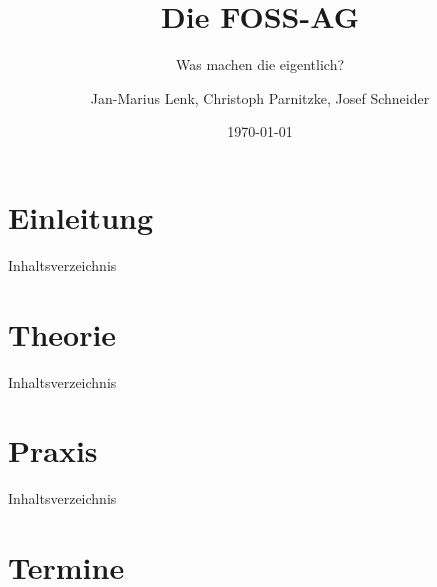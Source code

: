 \documentclass[12pt,utf8]{beamer}
\title{Die FOSS-AG}
\subtitle{Was machen die eigentlich?}
\author[J.-M. Lenk, C. Parnitzke, J. Schneider]{Jan-Marius Lenk, Christoph Parnitzke, Josef Schneider}
\institute[FOSS AG]{Free and Open Source Software AG\\ Fakultät für Informatik}
\date{\today}
\begin{document}
\begin{frame}
	\titlepage
\end{frame}

\section{Einleitung}

\begin{frame}{Inhaltsverzeichnis}
\end{frame}




\section{Theorie}

\begin{frame}{Inhaltsverzeichnis}
\end{frame}




\section{Praxis}

\begin{frame}{Inhaltsverzeichnis}
\end{frame}




\section{Termine}



\end{document}

